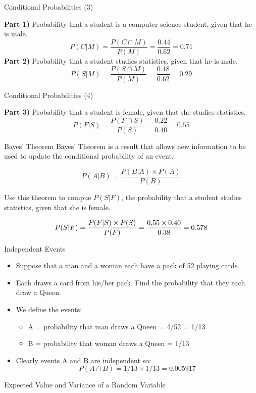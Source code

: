 \documentclass[]{report}
\begin{document}
{{{{{{{}
{
	{Conditional Probabilities (3)}
	
	\textbf{Part 1)} Probability that a student is a computer science student, given that he is male.
	\[ P(C|M) = \frac{P(C \cap M)}{P(M)}  = \frac{0.44}{0.62} = 0.71 \]
	\textbf{Part 2)} Probability that a student studies statistics, given that he is male.
	\[ P(S|M) = \frac{P(S \cap M)}{P(M)}  = \frac{0.18}{0.62} = 0.29 \]
	
}

{
	{Conditional Probabilities (4)}
	
	\textbf{Part 3)} Probability that a student is female, given that she studies statistics.
	\[ P(F|S) = \frac{P(F \cap S)}{P(S)}  = \frac{0.22}{0.40} = 0.55 \]
	
	
	
	
}
{
	{Bayes' Theorem}
	Bayes' Theorem is a result that allows new information to be used to update the conditional probability of an event.
	\bigskip
	
	\[ P(A|B) = \frac{P(B|A)\times P(A)}{P(B)} \]
	
	Use this theorem to compue $P(S|F)$, the probability that a student studies statistics, given that she is female.
	
	\[ P(S|F) = \frac{P(F|S)\times P(S)}{P(F)} = {0.55 \times 0.40 \over 0.38} = 0.578\]
}

{
	{Independent Events}
	\begin{itemize}
		\item Suppose that a man and a woman each have a pack of 52 playing cards.
		\item Each draws a card from his/her pack. Find the probability that they each draw a Queen.
		\item We define the events:
		\begin{itemize} \normalsize \item A = probability that man draws a Queen = 4/52  = 1/13
			\item B = probability that woman draws a Queen = 1/13
		\end{itemize} \item Clearly events A and B are independent so:
		\[ P(A \cap B) = 1/13 \times 1/13 = 0.005917 \]
	\end{itemize}
	
}
{
	{Expected Value and Variance of a Random Variable}
	
}}}}}}}
\end{document}
